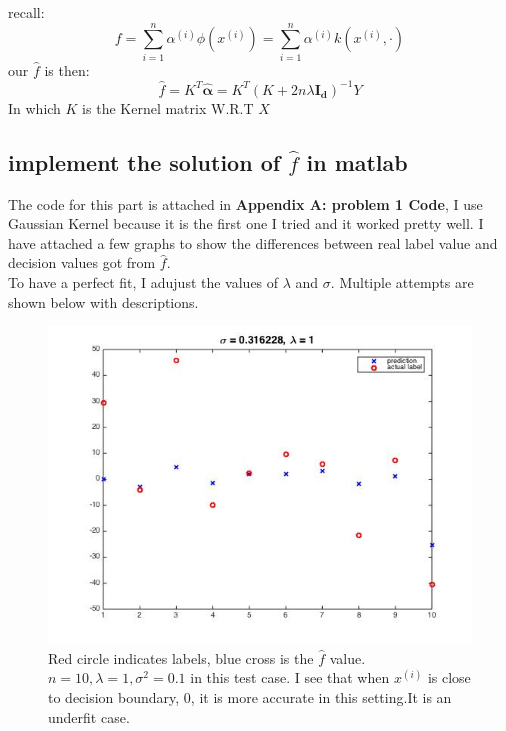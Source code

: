 \documentclass[twoside]{article}
\theoremstyle{definition}
\theoremstyle{definition}
\theoremstyle{remark}
\begin{document}
recall:
\[ f = \sum_{i=1}^n\alpha^{(i)}\phi(x^{(i)})= \sum_{i=1}^n\alpha^{(i)}k(x^{(i)},\cdot)\]
our $\hat f$ is then:
\[\hat f = K^T\boldsymbol{\hat \alpha}= K^T (K +  2n\lambda\mathbf{I_d})^{-1}Y\] In which $K$ is the Kernel matrix W.R.T $X$
\subsection{implement the solution of $\hat f$ in matlab}
The code for this part is attached in \textbf{Appendix A: problem 1 Code}, I use Gaussian Kernel because it is the first one I tried and it worked pretty well. I have attached a few graphs to show the differences between real label value and decision values got from $\hat f$.\\
To have a perfect fit, I adujust the values of $\lambda$ and $\sigma$. 
Multiple attempts are shown below with descriptions.
\begin{figure}[H]
\centering
\includegraphics[width=120mm]{problem1Pic1.jpg}
\caption{Red circle indicates labels, blue cross is the $\hat f$ value. $n=10, \lambda =1, \sigma^2 = 0.1$ in this test case. I see that when $x^{(i)}$ is close to decision boundary, 0, it is more accurate in this setting.It is an underfit case.  \label{problem1Pic1}}
\end{figure}
\end{document}
